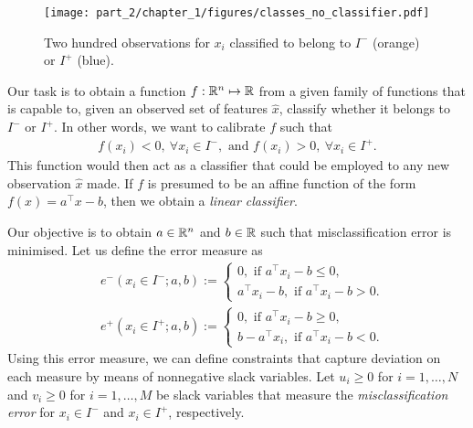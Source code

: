 \begin{figure}
    \texttt{[image: part\_2/chapter\_1/figures/classes\_no\_classifier.pdf]}
    \caption{Two hundred observations for $x_i$ classified to belong to $I^-$ (orange) or $I^+$ (blue).}        
    \label{fig:classified_observations}
\end{figure}

Our task is to obtain a function $f:\mathbb{R}^n \mapsto \mathbb{R}$ from a given family of functions that is capable to, given an observed set of features $\hat{x}$, classify whether it belongs to $I^-$ or $I^+$. In other words, we want to calibrate $f$ such that
%
\begin{align}
	f(x_i) < 0, \ \forall x_i \in I^-, \text{ and } f(x_i) > 0, \ \forall x_i \in I^+.  
\end{align}
%
This function would then act as a classifier that could be employed to any new observation $\hat{x}$ made. If $f$ is presumed to be an affine function of the form $f(x) = a^\top x - b$, then we obtain a \emph{linear classifier}. 

Our objective is to obtain $a \in \mathbb{R}^n$ and $b \in \mathbb{R}$ such that misclassification error is minimised. Let us define the error measure as
%
\begin{align*}
& e^-(x_i \in I^-; a, b) := 
    \begin{cases} 0, \text{ if } a^\top x_i - b \leq 0, \\
        a^\top x_i - b, \text{ if } a^\top x_i - b > 0.
    \end{cases} \\
& e^+(x_i \in I^+; a, b) := 
    \begin{cases} 0, \text{ if } a^\top x_i - b \geq 0, \\
        b -  a^\top x_i, \text{ if } a^\top x_i - b < 0.
    \end{cases}                   
\end{align*}
%
Using this error measure, we can define constraints that capture deviation on each measure by means of nonnegative slack variables. Let $u_i \geq 0$ for $i = 1, \dots, N$ and $v_i \geq 0$ for $i = 1,\dots, M$ be slack variables that measure the \emph{misclassification error} for $x_i \in I^-$ and $x_i \in I^+$, respectively.

